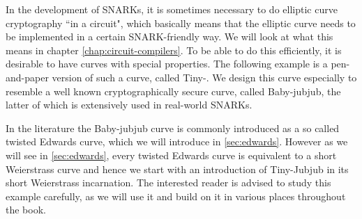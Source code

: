 In the development of SNARKs, it is sometimes necessary to do elliptic curve cryptography ``in a circuit", which basically means that the elliptic curve needs to be implemented in a certain SNARK-friendly way. We will look at what this means in chapter \ref{chap:circuit-compilers}. To be able to do this efficiently, it is desirable to have curves with special properties. The following example is a pen-and-paper version of such a curve, called Tiny-. We design this curve especially to resemble a well known cryptographically secure curve, called Baby-jubjub, the latter of which is extensively used in real-world SNARKs. 

In the literature the Baby-jubjub curve is commonly introduced as a so called twisted Edwards curve, which we will introduce in \ref{sec:edwards}. However as we will see in \ref{sec:edwards}, every twisted Edwards curve is equivalent to a short Weierstrass curve and hence we start with an introduction of Tiny-Jubjub in its short Weierstrass incarnation. The interested reader is advised to study this example carefully, as we will use it and build on it in various places throughout the book. 

